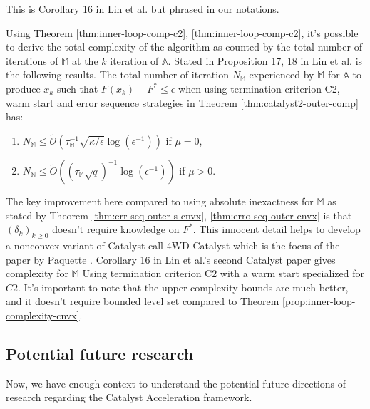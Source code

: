\documentclass[12pt]{article}
\begin{document}
            \begin{remark}
                This is Corollary 16 in Lin et al. \cite{lin_catalyst_2018} but phrased in our notations. 
            \end{remark}
            Using Theorem \ref{thm:inner-loop-comp-c2}, \ref{thm:inner-loop-comp-c2}, it's possible to derive the total complexity of the algorithm as counted by the total number of iterations of $\mathbb M$ at the $k$ iteration of $\mathbb A$.
            Stated in Proposition 17, 18 in Lin et al. \cite{lin_catalyst_2018} is the following results.
            The total number of iteration $N_{\mathbb M}$ experienced by $\mathbb M$ for $\mathbb A$ to produce $x_k$ such that $F(x_k) - F^* \le \epsilon$ when using termination criterion C2, warm start and error sequence strategies in Theorem \ref{thm:catalyst2-outer-comp} has: 
            \begin{enumerate}
                \item $N_{\mathbb M} \le \widetilde{\mathcal O}\left(\tau_{\mathbb M}^{-1}\sqrt{\kappa/\epsilon}\log(\epsilon^{-1})\right)$ if $\mu = 0$, 
                \item $N_{\mathbb N}\le \widetilde{O}\left((\tau_{\mathbb M}\sqrt{q})^{-1}\log(\epsilon^{-1})\right)$ if $\mu > 0$. 
            \end{enumerate}
            \par
            The key improvement here compared to using absolute inexactness for $\mathbb M$ as stated by Theorem \ref{thm:err-seq-outer-s-cnvx}, \ref{thm:erro-seq-outer-cnvx} is that $(\delta_k)_{k \ge0}$ doesn't require knowledge on $F^*$. 
            This innocent detail helps to develop a nonconvex variant of Catalyst call 4WD Catalyst which is the focus of the paper by Paquette \cite{paquette_catalyst_2018}. 
            Corollary 16 in Lin et al.'s second Catalyst paper \cite{lin_catalyst_2018} gives complexity for $\mathbb M$ Using termination criterion C2 with a warm start specialized for $C2$. 
            It's important to note that the upper complexity bounds are much better, and it doesn't require bounded level set compared to Theorem \ref{prop:inner-loop-complexity-cnvx}.         
    \subsection{Potential future research}\label{ssec:catalyst-future}
        Now, we have enough context to understand the potential future directions of research regarding the Catalyst Acceleration framework. 
\end{document}
